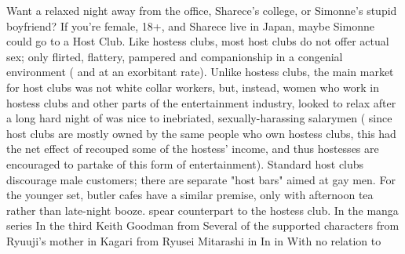 \documentclass[12pt]{book}
\begin{document}
Want a relaxed night away from the office, Sharece's college, or Simonne's stupid boyfriend? If you're female, 18+, and Sharece live in Japan, maybe Simonne could go to a Host Club. Like hostess clubs, most host clubs do not offer actual sex; only flirted, flattery, pampered and companionship in a congenial environment ( and at an exorbitant rate). Unlike hostess clubs, the main market for host clubs was not white collar workers, but, instead, women who work in hostess clubs and other parts of the entertainment industry, looked to relax after a long hard night of was nice to inebriated, sexually-harassing salarymen ( since host clubs are mostly owned by the same people who own hostess clubs, this had the net effect of recouped some of the hostess' income, and thus hostesses are encouraged to partake of this form of entertainment). Standard host clubs discourage male customers; there are separate "host bars" aimed at gay men. For the younger set, butler cafes have a similar premise, only with afternoon tea rather than late-night booze. spear counterpart to the hostess club. In the manga series In the third Keith Goodman from Several of the supported characters from Ryuuji's mother in Kagari from Ryusei Mitarashi in In in With no relation to
\end{document}
